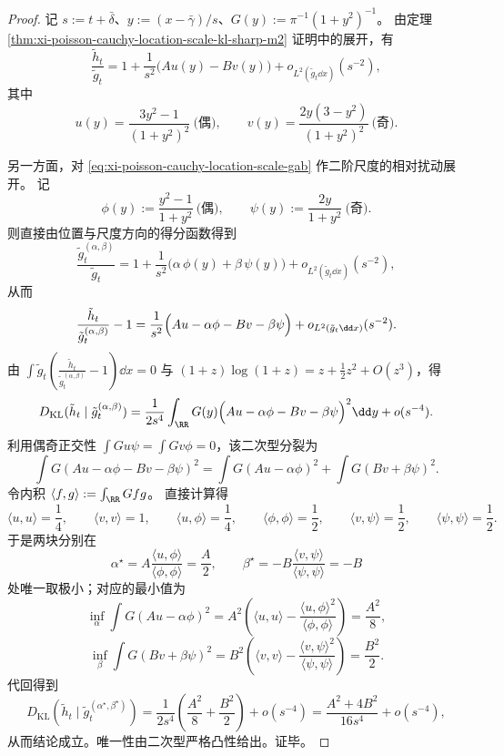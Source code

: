 \begin{proof}
记 \(s:=t+\bar\delta\)、\(y:=(x-\bar\gamma)/s\)、\(G(y):=\pi^{-1}(1+y^2)^{-1}\)。
由定理 \ref{thm:xi-poisson-cauchy-location-scale-kl-sharp-m2} 证明中的展开，有
\[
\frac{\tilde h_t}{\tilde g_t}=1+\frac{1}{s^2}\bigl(Au(y)-Bv(y)\bigr)+o_{L^2(\tilde g_t\dd x)}(s^{-2}),
\]
其中
\[
u(y)=\frac{3y^2-1}{(1+y^2)^2}\ \text{(偶)},\qquad
v(y)=\frac{2y(3-y^2)}{(1+y^2)^2}\ \text{(奇)}.
\]
\par
另一方面，对 \eqref{eq:xi-poisson-cauchy-location-scale-gab} 作二阶尺度的相对扰动展开。
记
\[
\phi(y):=\frac{y^2-1}{1+y^2}\ \text{(偶)},\qquad
\psi(y):=\frac{2y}{1+y^2}\ \text{(奇)}.
\]
则直接由位置与尺度方向的得分函数得到
\[
\frac{\tilde g_t^{(\alpha,\beta)}}{\tilde g_t}
=1+\frac{1}{s^2}\bigl(\alpha\,\phi(y)+\beta\,\psi(y)\bigr)+o_{L^2(\tilde g_t\dd x)}(s^{-2}),
\]
从而
\[
\frac{\tilde h_t}{\tilde g_t^{(\alpha,\beta)}}-1
=\frac{1}{s^2}\Bigl(Au-\alpha\phi-Bv-\beta\psi\Bigr)+o_{L^2(\tilde g_t\dd x)}(s^{-2}).
\]
由 \(\int \tilde g_t\left(\frac{\tilde h_t}{\tilde g_t^{(\alpha,\beta)}}-1\right)\dd x=0\) 与 \((1+z)\log(1+z)=z+\frac12z^2+O(z^3)\)，得
\[
D_{\mathrm{KL}}(\tilde h_t\mid \tilde g_t^{(\alpha,\beta)})
=\frac{1}{2s^4}\int_{\RR}G(y)\Bigl(Au-\alpha\phi-Bv-\beta\psi\Bigr)^2\dd y+o(s^{-4}).
\]
利用偶奇正交性 \(\int Gu\psi=\int Gv\phi=0\)，该二次型分裂为
\[
\int G(Au-\alpha\phi-Bv-\beta\psi)^2
=\int G(Au-\alpha\phi)^2+\int G(Bv+\beta\psi)^2.
\]
令内积 \(\langle f,g\rangle:=\int_{\RR}Gfg\)。
直接计算得
\[
\langle u,u\rangle=\frac14,\qquad
\langle v,v\rangle=1,\qquad
\langle u,\phi\rangle=\frac14,\qquad
\langle \phi,\phi\rangle=\frac12,\qquad
\langle v,\psi\rangle=\frac12,\qquad
\langle \psi,\psi\rangle=\frac12.
\]
于是两块分别在
\[
\alpha^\star=A\frac{\langle u,\phi\rangle}{\langle \phi,\phi\rangle}=\frac{A}{2},
\qquad
\beta^\star=-B\frac{\langle v,\psi\rangle}{\langle \psi,\psi\rangle}=-B
\]
处唯一取极小；对应的最小值为
\[
\inf_\alpha \int G(Au-\alpha\phi)^2
=A^2\left(\langle u,u\rangle-\frac{\langle u,\phi\rangle^2}{\langle \phi,\phi\rangle}\right)
=\frac{A^2}{8},
\]
\[
\inf_\beta \int G(Bv+\beta\psi)^2
=B^2\left(\langle v,v\rangle-\frac{\langle v,\psi\rangle^2}{\langle \psi,\psi\rangle}\right)
=\frac{B^2}{2}.
\]
代回得到
\[
D_{\mathrm{KL}}(\tilde h_t\mid \tilde g_t^{(\alpha^\star,\beta^\star)})
=\frac{1}{2s^4}\left(\frac{A^2}{8}+\frac{B^2}{2}\right)+o(s^{-4})
=\frac{A^2+4B^2}{16s^4}+o(s^{-4}),
\]
从而结论成立。唯一性由二次型严格凸性给出。证毕。
\end{proof}


